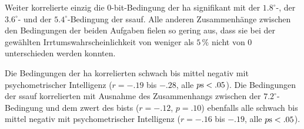 \documentclass[11pt, twoside, a4paper]{book}		%
\begin{document}
Weiter korrelierte einzig die 0-bit-Bedingung der \gls{ha} signifikant mit der $1.8^{\circ}$-, der $3.6^{\circ}$- und der $5.4^{\circ}$-Bedingung der \gls{ssauf}. Alle anderen Zusammenhänge zwischen den Bedingungen der beiden Aufgaben fielen so gering aus, dass sie bei der gewählten Irrtumswahrscheinlichkeit von weniger als $5\,\%$ nicht von 0 unterschieden werden konnten.

Die Bedingungen der \gls{ha} korrelierten schwach bis mittel negativ mit psychometrischer Intelligenz ($r=-.19$ bis $-.28$, alle $p\textnormal{s}<.05$).
Die Bedingungen der \gls{ssauf} korrelierten mit Ausnahme des Zusammenhangs zwischen der $7.2^{\circ}$-Bedingung und dem \gls{zwert} des \gls{bist}s ($r=-.12$, $p=.10$) ebenfalls alle schwach bis mittel negativ mit psychometrischer Intelligenz ($r=-.16$ bis $-.19$, alle $p\textnormal{s}<.05$).
\end{document}
